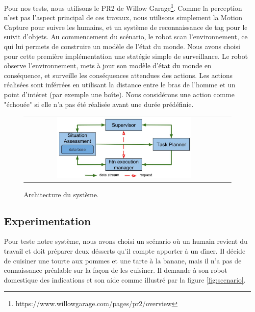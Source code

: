 \documentclass[a4paper,11pt,twoside]{StyleThese}
\begin{document}
Pour nos tests, nous utilisons le PR2 de Willow Garage\footnote{https://www.willowgarage.com/pages/pr2/overview}. Comme la perception n'est pas l'aspect principal de ces travaux, nous utilisons simplement la Motion Capture pour suivre les humains, et un système de reconnaissance de tag pour le suivit d'objets.
Au commencement du scénario, le robot scan l'environnement, ce qui lui permets de construire un modèle de l'état du monde.
Nous avons choisi pour cette première implémentation une statégie simple de surveillance. Le robot observe l'environnement, mets à jour son modèle d'état du monde en conséquence, et surveille les conséquences attendues des actions. Les actions réalisées sont inférrées en utilisant la distance entre le bras de l'homme et un point d'intéret (par exemple une boîte). Nous considérons une action comme "échouée" si elle n'a pas été réalisée avant une durée prédéfinie.

%
%
%
\begin{figure}[ht!]

 \centering
 \begin{tabular}{cc}
  \includegraphics[width=0.69\textwidth]{img/archi.jpg}
 \end{tabular}
 \caption{Architecture du système.}
 \label{fig:architecture}
 \end{figure}
 
 \subsection{Experimentation}
 \label{sec:experiment}
Pour teste notre système, nous avons choisi un scénario où un humain revient du travail et doit préparer deux désserts qu'il compte apporter à un dîner. Il décide de cuisiner une tourte aux pommes et une tarte à la banane, mais il n'a pas de connaissance préalable sur la façon de les cuisiner. Il demande à son robot domestique des indications et son aide comme illustré par la figure \ref{fig:scenario}.
\end{document}
